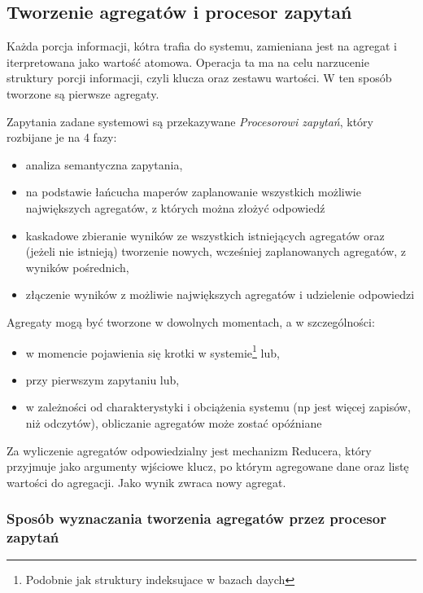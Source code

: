 \subsection{Tworzenie agregatów i procesor zapytań}

Każda porcja informacji, kótra trafia do systemu, zamieniana jest na agregat i iterpretowana jako wartość atomowa. Operacja ta ma na celu narzucenie struktury porcji informacji, czyli klucza oraz zestawu wartości. W ten sposób tworzone są pierwsze agregaty.

Zapytania zadane systemowi są przekazywane \emph{Procesorowi zapytań}, który rozbijane je na 4 fazy:

\begin{itemize}[noitemsep]
  \item analiza semantyczna zapytania,
  \item na podstawie łańcucha maperów zaplanowanie wszystkich możliwie największych agregatów, z których można złożyć odpowiedź
  \item kaskadowe zbieranie wyników ze wszystkich istniejących agregatów oraz (jeżeli nie istnieją) tworzenie nowych, wcześniej zaplanowanych agregatów, z wyników pośrednich,
  \item złączenie wyników z możliwie największych agregatów i udzielenie odpowiedzi
\end{itemize}

Agregaty mogą być tworzone w dowolnych momentach, a w szczególności:

\begin{itemize}[noitemsep]
  \item w momencie pojawienia się krotki w systemie\footnote{Podobnie jak struktury indeksujace w bazach daych} lub,
  \item przy pierwszym zapytaniu lub,
  \item w zależności od charakterystyki i obciążenia systemu (np jest więcej zapisów, niż odczytów), obliczanie agregatów może zostać opóźniane
\end{itemize}

Za wyliczenie agregatów odpowiedzialny jest mechanizm Reducera, który przyjmuje jako argumenty wjściowe klucz, po którym agregowane dane oraz listę wartości do agregacji. Jako wynik zwraca nowy agregat.



\subsubsection{Sposób wyznaczania tworzenia agregatów przez procesor zapytań}

